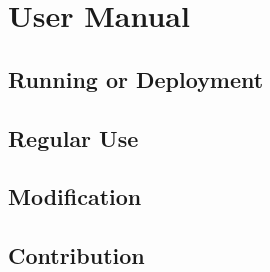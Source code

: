 \section{User Manual}
\label{sec:user-manual}

\subsection{Running or Deployment}


\subsection{Regular Use}


\subsection{Modification}


\subsection{Contribution}


